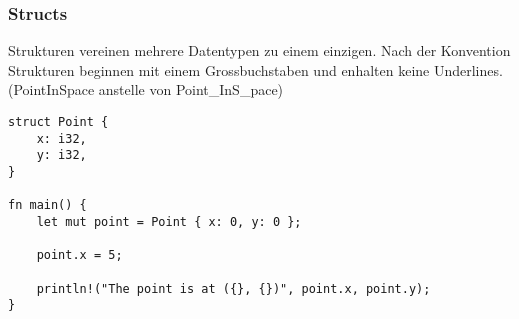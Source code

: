 \subsubsection{Structs}

Strukturen vereinen mehrere Datentypen zu einem einzigen. Nach der Konvention Strukturen beginnen mit einem Grossbuchstaben und enhalten keine Underlines. (PointInSpace anstelle von Point\_InS\_pace) 

\begin{lstlisting}
struct Point {
	x: i32,
	y: i32,
}

fn main() {
	let mut point = Point { x: 0, y: 0 };

	point.x = 5;

	println!("The point is at ({}, {})", point.x, point.y);
}
\end{lstlisting}